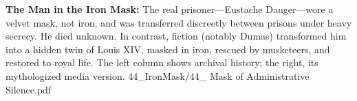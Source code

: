 \begin{SideNotePage}{
  \textbf{The Man in the Iron Mask:}  
  The real prisoner—Eustache Dauger—wore a velvet mask, not iron, and was transferred discreetly between prisons under heavy secrecy. He died unknown. In contrast, fiction (notably Dumas) transformed him into a hidden twin of Louis XIV, masked in iron, rescued by musketeers, and restored to royal life. The left column shows archival history; the right, its mythologized media version.
}{44_IronMask/44_ Mask of Administrative Silence.pdf}
\end{SideNotePage}
